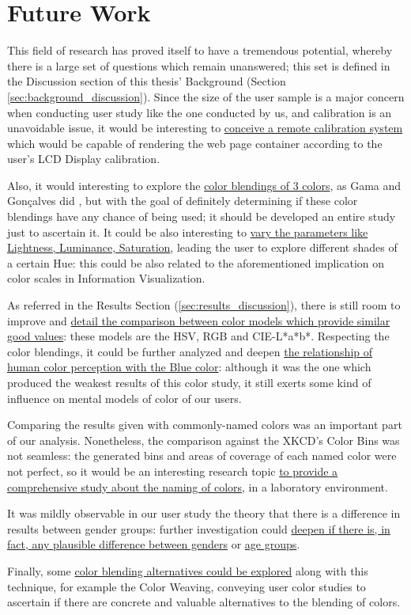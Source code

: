 \section{Future Work}
\label{sec:future_work}
%
This field of research has proved itself to have a tremendous potential, whereby there is a large set of questions which remain unanswered; this set is defined
in the Discussion section of this thesis' Background (Section \ref{sec:background_discussion}). Since the size of the user sample is a major concern when
conducting user study like the one conducted by us, and calibration is an unavoidable issue, it would be interesting to \ul{conceive a remote calibration system}
which would be capable of rendering the web page container according to the user's LCD Display calibration. \par
%
Also, it would interesting to explore the \ul{color blendings of 3 colors}, as Gama and Gonçalves did \cite{Gama20141}, but with the goal of definitely
determining if these color blendings have any chance of being used; it should be developed an entire study just to ascertain it. It could be also interesting
to \ul{vary the parameters like Lightness, Luminance, Saturation}, leading the user to explore different shades of a certain Hue: this could be also related to
the aforementioned implication on color scales in Information Visualization. \par
%
As referred in the Results Section (\ref{sec:results_discussion}), there is still room to improve and \ul{detail the comparison between color models which provide
similar good values}: these models are the HSV, RGB and CIE-L*a*b*. Respecting the color blendings, it could be further analyzed and deepen \ul{the relationship of human
color perception with the Blue color}: although it was the one which produced the weakest results of this color study, it still exerts some kind of influence on
mental models of color of our users. \par
%
Comparing the results given with commonly-named colors was an important part of our analysis. Nonetheless, the comparison against the XKCD's Color Bins was not seamless:
the generated bins and areas of coverage of each named color were not perfect, so it would be an interesting research topic \ul{to provide a comprehensive study about
the naming of colors}, in a laboratory environment. \par
%
It was mildly observable in our user study the theory that there is a difference in results between gender groups: further investigation could \ul{deepen if there is, in
fact, any plausible difference between genders} or \ul{age groups}. \par
%
Finally, some \ul{color blending alternatives could be explored} along with this technique, for example the Color Weaving, conveying user color studies to ascertain if
there are concrete and valuable alternatives to the blending of colors.
%
